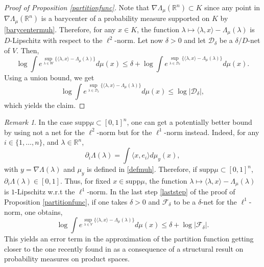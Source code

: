 \documentclass[aop,preprint]{imsart}
\newcommand\RR{\mathbb{R}}
\newcommand\supp{\mathrm{supp}}
\numberwithin{equation}{section}
\theoremstyle{definition}
\theoremstyle{plain}
\theoremstyle{remark}
\newtheorem{Rem}[Def]{Remark}
\begin{document}
\begin{proof}[Proof of Proposition \ref{partitionfunc}]
Note that $\nabla \Lambda_\mu(\RR^n) \subset K$ since any point in $\nabla \Lambda_\mu(\RR^n) $ is a barycenter of a probability measure supported on $K$  by \eqref{barycentermuh}. Therefore, for any $x\in K$, the function $\lambda \mapsto \langle \lambda, x\rangle - \Lambda_{\mu}(\lambda)$ is $D$-Lipschitz with respect to the $\ell^2$-norm. Let now $\delta>0$ and let $\mathcal{D}_{\delta}$ be a $\delta/D$-net of $V$. Then, 
$$ \log \int e^{ \sup_{\lambda\in W} \{ \langle \lambda, x\rangle - \Lambda_{\mu}(\lambda)\}} d\mu(x) \leq \delta + \log \int e^{ \sup_{\lambda\in \mathcal{D}_{\delta}} \{ \langle \lambda, x\rangle - \Lambda_{\mu}(\lambda)\}} d\mu(x).$$
Using a union bound, we get
$$ \log \int e^{ \sup_{\lambda\in \mathcal{D}_{\delta}} \{ \langle \lambda, x\rangle - \Lambda_{\mu}(\lambda)\}} d\mu(x) \leq 
\log |\mathcal{D}_{\delta}|,$$
which yields the claim.




\end{proof}

\begin{Rem}
In the case $\supp \mu \subset [0,1]^n$, one can get a potentially better bound by using not a net for the $\ell^2$-norm but for the $\ell^1$-norm instead. Indeed, for any $i\in\{1,\ldots,n\}$, and $\lambda \in \RR^n$, 
$$ \partial_i \Lambda(\lambda) = \int \langle x, e_i\rangle d \mu_y(x),$$
with $y= \nabla \Lambda(\lambda)$ and $\mu_y$ is defined in \eqref{defmuh}. Therefore, if $\supp \mu \subset [0,1]^n$, $\partial_i \Lambda(\lambda) \in [0,1]$. Thus, for fixed $x \in \supp \mu$, the function $\lambda \mapsto \langle \lambda, x\rangle -\Lambda_\mu(\lambda)$ is $1$-Lipschitz w.r.t the $\ell^1$-norm. In the last step \eqref{laststep} of the proof of Proposition \ref{partitionfunc}, if one takes $\delta>0$ and $\mathcal{F}_\delta$ to be a $\delta$-net for the $\ell^1$-norm, one obtains,
$$ \log \int e^{ \sup_{\lambda\in V} \{ \langle \lambda, x\rangle - \Lambda_{\mu}(\lambda)\}} d\mu(x) \leq \delta + \log |\mathcal{F}_\delta|.$$
This yields an error term in the approximation of the partition function getting closer to the one recently found in \cite[Proposition 5.1]{A} as a consequence of a structural result on probability measures on product spaces.
\end{Rem}
\end{document}
